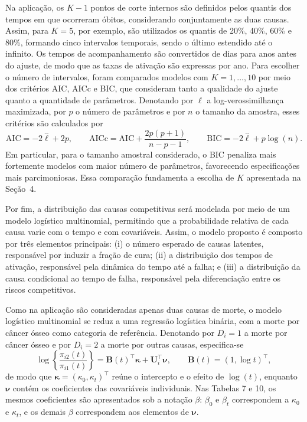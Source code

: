 \documentclass[11pt,a4paper]{article}
\begin{document}
Na aplicação, os $K-1$ pontos de corte internos são definidos pelos quantis dos tempos em que ocorreram óbitos, considerando conjuntamente as duas causas. Assim, para $K=5$, por exemplo, são utilizados os quantis de 20\%, 40\%, 60\% e 80\%, formando cinco intervalos temporais, sendo o último estendido até o infinito. Os tempos de acompanhamento são convertidos de dias para anos antes do ajuste, de modo que as taxas de ativação são expressas por ano. Para escolher o número de intervalos, foram comparados modelos com $K=1,\ldots,10$ por meio dos critérios AIC, AICc e BIC, que consideram tanto a qualidade do ajuste quanto a quantidade de parâmetros. Denotando por $\widehat\ell$ a log-verossimilhança maximizada, por $p$ o número de parâmetros e por $n$ o tamanho da amostra, esses critérios são calculados por
\begin{equation}
\mathrm{AIC}=-2\widehat\ell+2p,\qquad
\mathrm{AICc}=\mathrm{AIC}+\frac{2p(p+1)}{n-p-1},\qquad
\mathrm{BIC}=-2\widehat\ell+p\log(n).
\end{equation}
Em particular, para o tamanho amostral considerado, o BIC penaliza mais fortemente modelos com maior número de parâmetros, favorecendo especificações mais parcimoniosas. Essa comparação fundamenta a escolha de $K$ apresentada na Seção~4.


Por fim, a distribuição das causas competitivas será modelada por meio de um modelo logístico multinomial, permitindo que a probabilidade relativa de cada causa varie com o tempo e com covariáveis. Assim, o modelo proposto é composto por três elementos principais: (i) o número esperado de causas latentes, responsável por induzir a fração de cura; (ii) a distribuição dos tempos de ativação, responsável pela dinâmica do tempo até a falha; e (iii) a distribuição da causa condicional ao tempo de falha, responsável pela diferenciação entre os riscos competitivos.

Como na aplicação são consideradas apenas duas causas de morte, o modelo logístico multinomial se reduz a uma regressão logística binária, com a morte por câncer ósseo como categoria de referência. Denotando por $D_i=1$ a morte por câncer ósseo e por $D_i=2$ a morte por outras causas, especifica-se
\begin{equation}
\log\left\{\frac{\pi_{i2}(t)}{\pi_{i1}(t)}\right\}
=\bm B(t)^\top\boldsymbol\kappa+\bm U_i^\top\boldsymbol\nu,
\qquad \bm B(t)=(1,\log t)^\top,
\end{equation}
\noindent de modo que $\boldsymbol\kappa=(\kappa_0,\kappa_t)^\top$ reúne o intercepto e o efeito de $\log(t)$, enquanto $\boldsymbol\nu$ contém os coeficientes das covariáveis individuais. Nas Tabelas 7 e 10, os mesmos coeficientes são apresentados sob a notação $\beta$: $\beta_0$ e $\beta_t$ correspondem a $\kappa_0$ e $\kappa_t$, e os demais $\beta$ correspondem aos elementos de $\boldsymbol\nu$.
\end{document}
